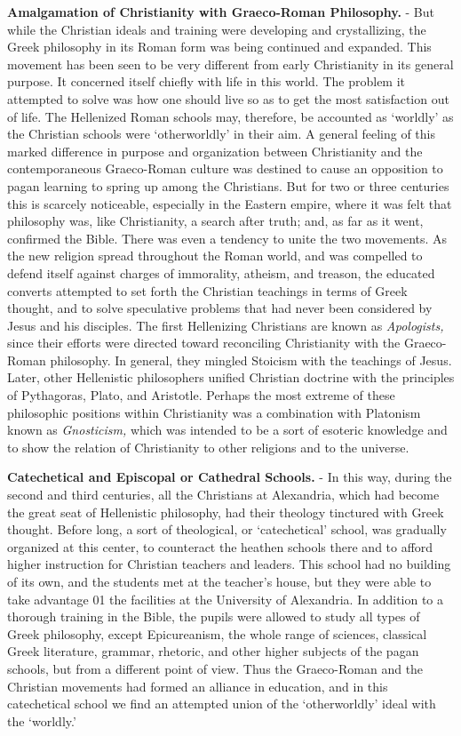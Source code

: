 \documentclass[
]{book}
\begin{document}
\textbf{Amalgamation of Christianity with Graeco-Roman Philosophy.} - But while the Christian ideals and training were developing and crystallizing, the Greek philosophy in its Roman form was being continued and expanded. This movement has been seen to be very different from early Christianity in its general purpose. It concerned itself chiefly with life in this world. The problem it attempted to solve was how one should live so as to get the most satisfaction out of life. The Hellenized Roman schools may, therefore, be accounted as `worldly' as the Christian schools were `otherworldly' in their aim. A general feeling of this marked difference in purpose and organization between Christianity and the contemporaneous Graeco-Roman culture was destined to cause an opposition to pagan learning to spring up among the Christians. But for two or three centuries this is scarcely noticeable, especially in the Eastern empire, where it was felt that philosophy was, like Christianity, a search after truth; and, as far as it went, confirmed the Bible. There was even a tendency to unite the two movements. As the new religion spread throughout the Roman world, and was compelled to defend itself against charges of immorality, atheism, and treason, the educated converts attempted to set forth the Christian teachings in terms of Greek thought, and to solve speculative problems that had never been considered by Jesus and his disciples. The first Hellenizing Christians are known as \emph{Apologists,} since their efforts were directed toward reconciling Christianity with the Graeco-Roman philosophy. In general, they mingled Stoicism with the teachings of Jesus. Later, other Hellenistic philosophers unified Christian doctrine with the principles of Pythagoras, Plato, and Aristotle. Perhaps the most extreme of these philosophic positions within Christianity was a combination with Platonism known as \emph{Gnosticism,} which was intended to be a sort of esoteric knowledge and to show the relation of Christianity to other religions and to the universe.

\textbf{Catechetical and Episcopal or Cathedral Schools.} - In this way, during the second and third centuries, all the Christians at Alexandria, which had become the great seat of Hellenistic philosophy, had their theology tinctured with Greek thought. Before long, a sort of theological, or `catechetical' school, was gradually organized at this center, to counteract the heathen schools there and to afford higher instruction for Christian teachers and leaders. This school had no building of its own, and the students met at the teacher's house, but they were able to take advantage 01 the facilities at the University of Alexandria. In addition to a thorough training in the Bible, the pupils were allowed to study all types of Greek philosophy, except Epicureanism, the whole range of sciences, classical Greek literature, grammar, rhetoric, and other higher subjects of the pagan schools, but from a different point of view. Thus the Graeco-Roman and the Christian movements had formed an alliance in education, and in this catechetical school we find an attempted union of the `otherworldly' ideal with the `worldly.'
\end{document}
